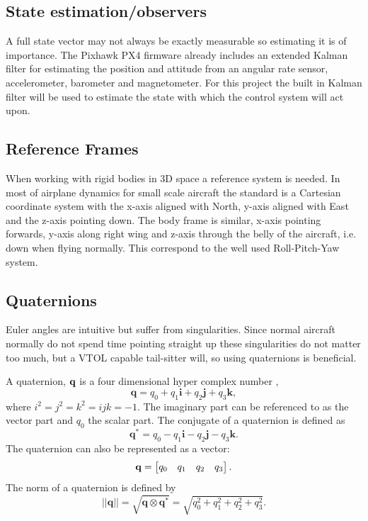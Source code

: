 \documentclass{article}
\begin{document}
\subsection{State estimation/observers}
A full state vector may not always be exactly measurable so estimating it is of importance.
The Pixhawk PX4 firmware already includes an extended Kalman filter for estimating the position and attitude from an angular rate sensor, accelerometer, barometer and magnetometer.
For this project the built in Kalman filter will be used to estimate the state with which the control system will act upon.

\subsection{Reference Frames}
When working with rigid bodies in 3D space a reference system is needed.
In most of airplane dynamics for small scale aircraft the standard is a Cartesian coordinate system with the x-axis aligned with North, y-axis aligned with East and the z-axis pointing down.
The body frame is similar, x-axis pointing forwards, y-axis along right wing and z-axis through the belly of the aircraft, i.e. down when flying normally.
This correspond to the well used Roll-Pitch-Yaw system.\cite{nelson}

\subsection{Quaternions}
Euler angles are intuitive but suffer from singularities.
Since normal aircraft normally do not spend time pointing straight up these singularities do not matter too much, but a VTOL capable tail-sitter will, so using quaternions is beneficial.

A quaternion, $\bold{q}$ is a four dimensional hyper complex number \cite{P2},
\begin{equation}
 \mathbf{q} = q_0 + q_1 \mathbf{i} + q_2 \mathbf{j} + q_3 \mathbf{k},
\end{equation}
where $i^2 = j^2 = k^2 = ijk = -1$.\cite{Sola2016}
The imaginary part can be referenced to as the vector part and $q_0$ the scalar part.
The conjugate of a quaternion is defined as
\begin{equation}
     \mathbf{q^*} = q_0 - q_1 \mathbf{i} - q_2 \mathbf{j} - q_3 \mathbf{k}.
\end{equation}
The quaternion can also be represented as a vector:
\begin{equation}
     \bold{q} = \left[
     \begin{matrix}
     q_0 &q_1 &q_2 &q_3
     \end{matrix}\right].
\end{equation}
The norm of a quaternion is defined by
\begin{equation}
    ||\mathbf{q}|| = \sqrt{\mathbf{q} \otimes \mathbf{q}^*} = \sqrt{q_0^2 + q_1^2 + q_2^2 + q_3^2}.
\end{equation}
\end{document}

